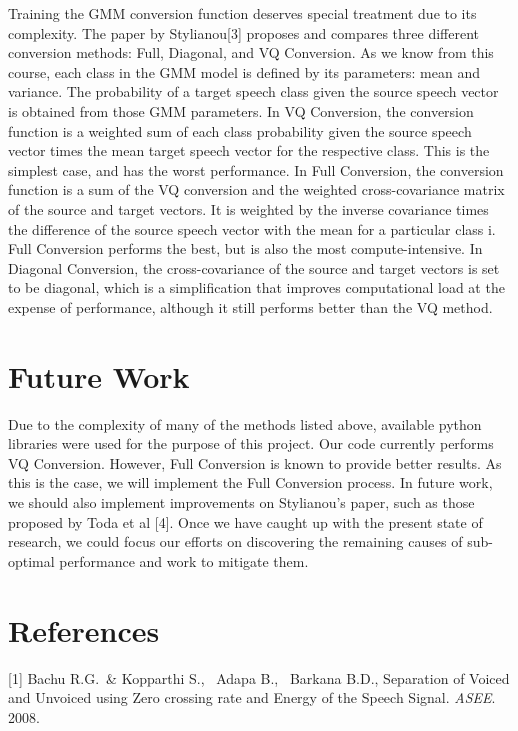 \documentclass{article}
\begin{document}
Training the GMM conversion function deserves special treatment due to its complexity. The paper by Stylianou[3] proposes and compares three different conversion methods: Full, Diagonal, and VQ Conversion. As we know from this course, each class in the GMM model is defined by its parameters: mean and variance. The probability of a target speech class given the source speech vector is obtained from those GMM parameters. In VQ Conversion, the conversion function is a weighted sum of each class probability given the source speech vector times the mean target speech vector for the respective class. This is the simplest case, and has the worst performance.  In Full Conversion, the conversion function is a sum of the VQ conversion and the weighted cross-covariance matrix of the source and target vectors. It is weighted by the inverse covariance times the difference of the source speech vector with the mean for a particular class i. Full Conversion performs the best, but is also the most compute-intensive. In Diagonal Conversion, the cross-covariance of the source and target vectors is set to be diagonal, which is a simplification that improves computational load at the expense of performance, although it still performs better than the VQ method. 

\section{Future Work}
 Due to the complexity of many of the methods listed above, available python libraries were used for the purpose of this project. Our code currently performs VQ Conversion. However, Full Conversion is known to provide better results. As this is the case, we will implement the Full Conversion process. In future work, we should also implement improvements on Stylianou's paper, such as those proposed by Toda et al [4]. Once we have caught up with the present state of research, we could focus our efforts on discovering the remaining causes of sub-optimal performance and work to mitigate them.

\section*{References}

\small

[1] Bachu R.G.\ \& Kopparthi S., \ Adapa B., \ Barkana B.D., Separation of Voiced and Unvoiced using Zero crossing rate and Energy of the Speech Signal.  {\it ASEE}. 2008. 
 
\end{document}
